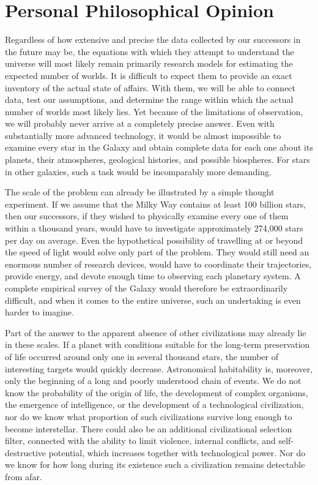 \clearpage
\onecolumngrid
{}
\section*{Personal Philosophical Opinion}

Regardless of how extensive and precise the data collected by our successors in the future may be, the equations with which they attempt to understand the universe will most likely remain primarily research models for estimating the expected number of worlds. It is difficult to expect them to provide an exact inventory of the actual state of affairs. With them, we will be able to connect data, test our assumptions, and determine the range within which the actual number of worlds most likely lies. Yet because of the limitations of observation, we will probably never arrive at a completely precise answer. Even with substantially more advanced technology, it would be almost impossible to examine every star in the Galaxy and obtain complete data for each one about its planets, their atmospheres, geological histories, and possible biospheres. For stars in other galaxies, such a task would be incomparably more demanding.

The scale of the problem can already be illustrated by a simple thought experiment. If we assume that the Milky Way contains at least 100 billion stars, then our successors, if they wished to physically examine every one of them within a thousand years, would have to investigate approximately 274,000 stars per day on average. Even the hypothetical possibility of travelling at or beyond the speed of light would solve only part of the problem. They would still need an enormous number of research devices, would have to coordinate their trajectories, provide energy, and devote enough time to observing each planetary system. A complete empirical survey of the Galaxy would therefore be extraordinarily difficult, and when it comes to the entire universe, such an undertaking is even harder to imagine.

Part of the answer to the apparent absence of other civilizations may already lie in these scales. If a planet with conditions suitable for the long-term preservation of life occurred around only one in several thousand stars, the number of interesting targets would quickly decrease. Astronomical habitability is, moreover, only the beginning of a long and poorly understood chain of events. We do not know the probability of the origin of life, the development of complex organisms, the emergence of intelligence, or the development of a technological civilization, nor do we know what proportion of such civilizations survive long enough to become interstellar. There could also be an additional civilizational selection filter, connected with the ability to limit violence, internal conflicts, and self-destructive potential, which increases together with technological power. Nor do we know for how long during its existence such a civilization remains detectable from afar.

